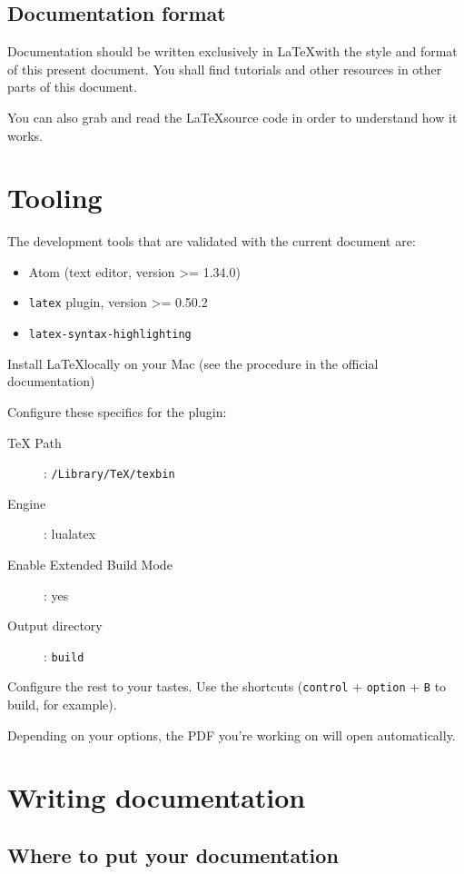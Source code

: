 \subsection{Documentation format}

Documentation should be written exclusively in \LaTeX with the style and format
of this present document. You shall find tutorials and other resources
in other parts of this document.

You can also grab and read the \LaTeX source code in order to understand how it works.


\section{Tooling}

The development tools that are validated with the current document are:

\begin{itemize}
    \item Atom (text editor, version >= 1.34.0)
    \item \texttt{latex} plugin, version >= 0.50.2
    \item \texttt{latex-syntax-highlighting}
\end{itemize}

Install \LaTeX locally on your Mac (see the procedure in the official documentation)

Configure these specifics for the plugin:

\begin{description}
    \item[TeX Path]: \texttt{/Library/TeX/texbin}
    \item[Engine]: lualatex
    \item[Enable Extended Build Mode]: yes
    \item[Output directory]: \texttt{build}
\end{description}

Configure the rest to your tastes. Use the shortcuts (\texttt{control} + \texttt{option} + \texttt{B} to build, for example).

Depending on your options, the PDF you're working on will open automatically.

\section{Writing documentation}

\subsection{Where to put your documentation}

